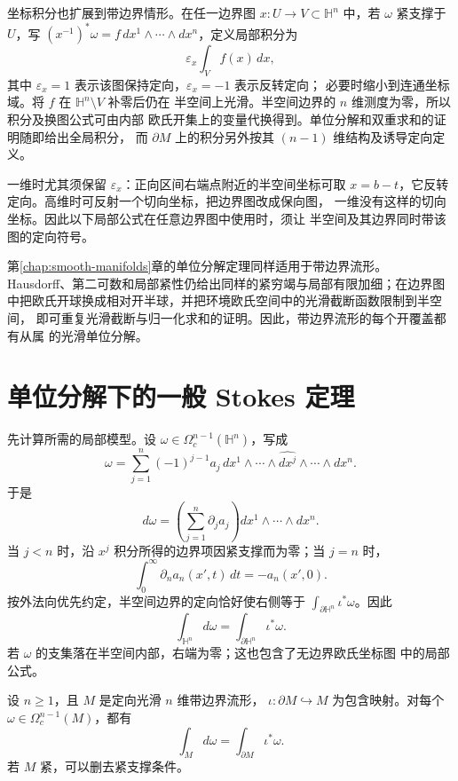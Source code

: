 坐标积分也扩展到带边界情形。在任一边界图 $x:U\to V\subset\mathbb H^n$
中，若 $\omega$ 紧支撑于 $U$，写 $(x^{-1})^*\omega=f\,dx^1\wedge\cdots
\wedge dx^n$，定义局部积分为
\[
 \varepsilon_x\int_V f(x)\,dx,
\]
其中 $\varepsilon_x=1$ 表示该图保持定向，$\varepsilon_x=-1$ 表示反转定向；
必要时缩小到连通坐标域。将 $f$ 在 $\mathbb H^n\setminus V$ 补零后仍在
半空间上光滑。半空间边界的 $n$ 维测度为零，所以积分及换图公式可由内部
欧氏开集上的变量代换得到。单位分解和双重求和的证明随即给出全局积分，
而 $\partial M$ 上的积分另外按其 $(n-1)$ 维结构及诱导定向定义。

一维时尤其须保留 $\varepsilon_x$：正向区间右端点附近的半空间坐标可取
$x=b-t$，它反转定向。高维时可反射一个切向坐标，把边界图改成保向图，
一维没有这样的切向坐标。因此以下局部公式在任意边界图中使用时，须让
半空间及其边界同时带该图的定向符号。

第\ref{chap:smooth-manifolds}章的单位分解定理同样适用于带边界流形。
Hausdorff、第二可数和局部紧性仍给出同样的紧穷竭与局部有限加细；在边界图
中把欧氏开球换成相对开半球，并把环境欧氏空间中的光滑截断函数限制到半空间，
即可重复光滑截断与归一化求和的证明。因此，带边界流形的每个开覆盖都有从属
的光滑单位分解。

\section{单位分解下的一般 Stokes 定理}

先计算所需的局部模型。设
$\omega\in\Omega_c^{n-1}(\mathbb H^n)$，写成
\[
 \omega=\sum_{j=1}^n(-1)^{j-1}a_j\,
 dx^1\wedge\cdots\wedge\widehat{dx^j}\wedge\cdots\wedge dx^n.
\]
于是
\[
 d\omega=\left(\sum_{j=1}^n\partial_ja_j\right)
 dx^1\wedge\cdots\wedge dx^n.
\]
当 $j<n$ 时，沿 $x^j$ 积分所得的边界项因紧支撑而为零；当 $j=n$ 时，
\[
 \int_0^\infty\partial_na_n(x',t)\,dt=-a_n(x',0).
\]
按外法向优先约定，半空间边界的定向恰好使右侧等于
$\int_{\partial\mathbb H^n}\iota^*\omega$。因此
\begin{equation}\label{eq:half-space-stokes}
 \int_{\mathbb H^n}d\omega
 =\int_{\partial\mathbb H^n}\iota^*\omega.
\end{equation}
若 $\omega$ 的支集落在半空间内部，右端为零；这也包含了无边界欧氏坐标图
中的局部公式。

\begin{theorem}\label{thm:manifold-stokes}
设 $n\ge1$，且 $M$ 是定向光滑 $n$ 维带边界流形，
$\iota:\partial M\hookrightarrow M$ 为包含映射。对每个
$\omega\in\Omega_c^{n-1}(M)$，都有
\[
 \int_Md\omega=\int_{\partial M}\iota^*\omega.
\]
若 $M$ 紧，可以删去紧支撑条件。
\end{theorem}


